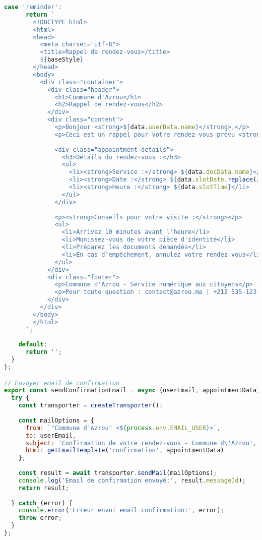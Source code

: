 \begin{lstlisting}[language=JavaScript, caption=emailService.js - Service complet de notifications]
    case 'reminder':
      return `
        <!DOCTYPE html>
        <html>
        <head>
          <meta charset="utf-8">
          <title>Rappel de rendez-vous</title>
          ${baseStyle}
        </head>
        <body>
          <div class="container">
            <div class="header">
              <h1>Commune d'Azrou</h1>
              <h2>Rappel de rendez-vous</h2>
            </div>
            <div class="content">
              <p>Bonjour <strong>${data.userData.name}</strong>,</p>
              <p>Ceci est un rappel pour votre rendez-vous prévu <strong>demain</strong>.</p>
              
              <div class="appointment-details">
                <h3>Détails du rendez-vous :</h3>
                <ul>
                  <li><strong>Service :</strong> ${data.docData.name}</li>
                  <li><strong>Date :</strong> ${data.slotDate.replace(/_/g, '/')}</li>
                  <li><strong>Heure :</strong> ${data.slotTime}</li>
                </ul>
              </div>
              
              <p><strong>Conseils pour votre visite :</strong></p>
              <ul>
                <li>Arrivez 10 minutes avant l'heure</li>
                <li>Munissez-vous de votre pièce d'identité</li>
                <li>Préparez les documents demandés</li>
                <li>En cas d'empêchement, annulez votre rendez-vous</li>
              </ul>
            </div>
            <div class="footer">
              <p>Commune d'Azrou - Service numérique aux citoyens</p>
              <p>Pour toute question : contact@azrou.ma | +212 535-123-000</p>
            </div>
          </div>
        </body>
        </html>
      `;
      
    default:
      return '';
  }
};

// Envoyer email de confirmation
export const sendConfirmationEmail = async (userEmail, appointmentData) => {
  try {
    const transporter = createTransporter();
    
    const mailOptions = {
      from: `"Commune d'Azrou" <${process.env.EMAIL_USER}>`,
      to: userEmail,
      subject: 'Confirmation de votre rendez-vous - Commune d\'Azrou',
      html: getEmailTemplate('confirmation', appointmentData)
    };
    
    const result = await transporter.sendMail(mailOptions);
    console.log('Email de confirmation envoyé:', result.messageId);
    return result;
    
  } catch (error) {
    console.error('Erreur envoi email confirmation:', error);
    throw error;
  }
};


\end{lstlisting}
